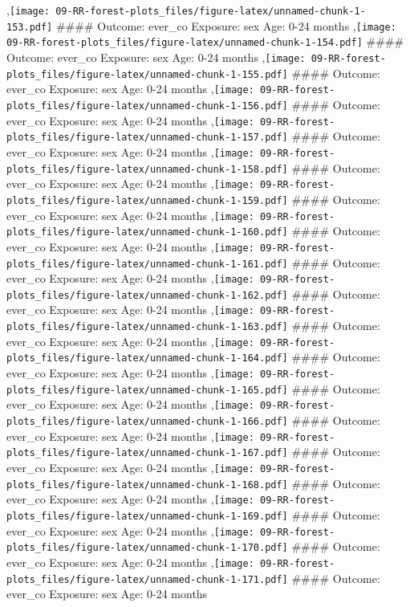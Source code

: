 \documentclass[
  9pt,
]{book}
\begin{document}
,\texttt{[image: 09-RR-forest-plots\_files/figure-latex/unnamed-chunk-1-153.pdf]}
\#\#\#\# Outcome: ever\_co Exposure: sex Age: 0-24 months
,\texttt{[image: 09-RR-forest-plots\_files/figure-latex/unnamed-chunk-1-154.pdf]}
\#\#\#\# Outcome: ever\_co Exposure: sex Age: 0-24 months
,\texttt{[image: 09-RR-forest-plots\_files/figure-latex/unnamed-chunk-1-155.pdf]}
\#\#\#\# Outcome: ever\_co Exposure: sex Age: 0-24 months
,\texttt{[image: 09-RR-forest-plots\_files/figure-latex/unnamed-chunk-1-156.pdf]}
\#\#\#\# Outcome: ever\_co Exposure: sex Age: 0-24 months
,\texttt{[image: 09-RR-forest-plots\_files/figure-latex/unnamed-chunk-1-157.pdf]}
\#\#\#\# Outcome: ever\_co Exposure: sex Age: 0-24 months
,\texttt{[image: 09-RR-forest-plots\_files/figure-latex/unnamed-chunk-1-158.pdf]}
\#\#\#\# Outcome: ever\_co Exposure: sex Age: 0-24 months
,\texttt{[image: 09-RR-forest-plots\_files/figure-latex/unnamed-chunk-1-159.pdf]}
\#\#\#\# Outcome: ever\_co Exposure: sex Age: 0-24 months
,\texttt{[image: 09-RR-forest-plots\_files/figure-latex/unnamed-chunk-1-160.pdf]}
\#\#\#\# Outcome: ever\_co Exposure: sex Age: 0-24 months
,\texttt{[image: 09-RR-forest-plots\_files/figure-latex/unnamed-chunk-1-161.pdf]}
\#\#\#\# Outcome: ever\_co Exposure: sex Age: 0-24 months
,\texttt{[image: 09-RR-forest-plots\_files/figure-latex/unnamed-chunk-1-162.pdf]}
\#\#\#\# Outcome: ever\_co Exposure: sex Age: 0-24 months
,\texttt{[image: 09-RR-forest-plots\_files/figure-latex/unnamed-chunk-1-163.pdf]}
\#\#\#\# Outcome: ever\_co Exposure: sex Age: 0-24 months
,\texttt{[image: 09-RR-forest-plots\_files/figure-latex/unnamed-chunk-1-164.pdf]}
\#\#\#\# Outcome: ever\_co Exposure: sex Age: 0-24 months
,\texttt{[image: 09-RR-forest-plots\_files/figure-latex/unnamed-chunk-1-165.pdf]}
\#\#\#\# Outcome: ever\_co Exposure: sex Age: 0-24 months
,\texttt{[image: 09-RR-forest-plots\_files/figure-latex/unnamed-chunk-1-166.pdf]}
\#\#\#\# Outcome: ever\_co Exposure: sex Age: 0-24 months
,\texttt{[image: 09-RR-forest-plots\_files/figure-latex/unnamed-chunk-1-167.pdf]}
\#\#\#\# Outcome: ever\_co Exposure: sex Age: 0-24 months
,\texttt{[image: 09-RR-forest-plots\_files/figure-latex/unnamed-chunk-1-168.pdf]}
\#\#\#\# Outcome: ever\_co Exposure: sex Age: 0-24 months
,\texttt{[image: 09-RR-forest-plots\_files/figure-latex/unnamed-chunk-1-169.pdf]}
\#\#\#\# Outcome: ever\_co Exposure: sex Age: 0-24 months
,\texttt{[image: 09-RR-forest-plots\_files/figure-latex/unnamed-chunk-1-170.pdf]}
\#\#\#\# Outcome: ever\_co Exposure: sex Age: 0-24 months
,\texttt{[image: 09-RR-forest-plots\_files/figure-latex/unnamed-chunk-1-171.pdf]}
\#\#\#\# Outcome: ever\_co Exposure: sex Age: 0-24 months
\end{document}
